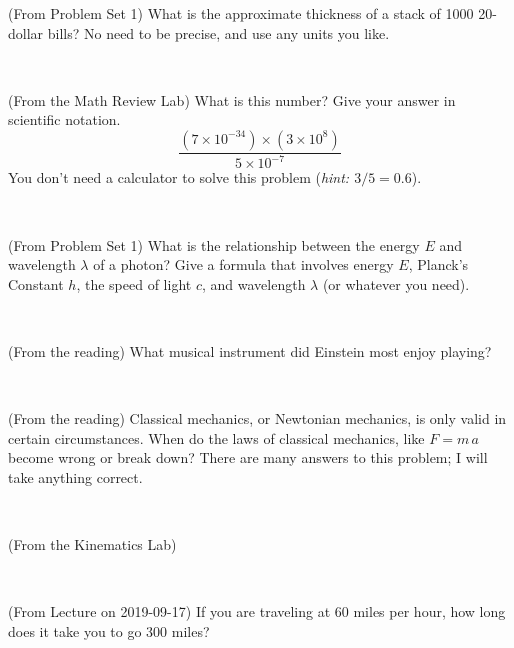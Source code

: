 \documentclass[12pt, letterpaper]{article}
\begin{document}
\begin{problem} (From Problem Set 1)
What is the approximate thickness of a stack of 1000 20-dollar bills?
No need to be precise, and use any units you like.
\end{problem}


\vfill ~

\begin{problem} (From the Math Review Lab)
What is this number? Give your answer in scientific notation.
$$
\frac{(7\times10^{-34})\times(3\times10^8)}{5\times10^{-7}}
$$
You don't need a calculator to solve this problem (\textit{hint: $3/5=0.6$}).
\end{problem}


\vfill ~

\begin{problem} (From Problem Set 1)
What is the relationship between the energy $E$ and wavelength
$\lambda$ of a photon? Give a formula that involves energy $E$,
Planck's Constant $h$, the speed of light $c$, and wavelength
$\lambda$ (or whatever you need).
\end{problem}

\vfill ~

\begin{problem} (From the reading)
What musical instrument did Einstein most enjoy playing?
\end{problem}


\vfill ~


\clearpage


\begin{problem} (From the reading)
Classical mechanics, or Newtonian mechanics, is only valid in certain
circumstances. When do the laws of classical mechanics, like $F =
m\,a$ become wrong or break down? There are many answers to this
problem; I will take anything correct.
\end{problem}


\vfill ~

\begin{problem} (From the Kinematics Lab)

\end{problem}


\vfill ~

\begin{problem} (From Lecture on 2019-09-17)
If you are traveling at 60 miles per hour, how long does
it take you to go 300 miles?
\end{problem}


\vfill ~
\end{document}
